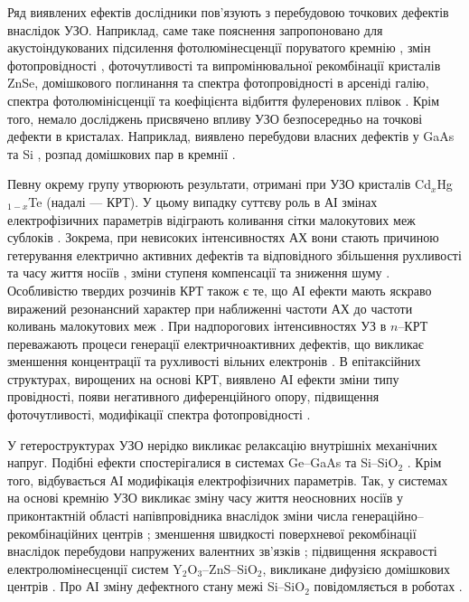 Ряд виявлених ефектів дослідники пов'язують з перебудовою точкових дефектів внаслідок УЗО.
Наприклад, саме таке пояснення запропоновано для акустоіндукованих
підсилення фотолюмінесценції поруватого кремнію \cite{Bahar2003},
змін фотопровідності \cite{US:ZnSe},  фоточутливості та випромінювальної рекомбінації  \cite{ZobovFTP2008} кристалів ZnSe,
домішкового поглинання \cite{Zaver2007} та спектра фотопровідності \cite{UST:GaAs2015} в арсеніді галію,
спектра фотолюмінісценції та коефіцієнта відбиття фулеренових плівок \cite{RITTER2008}.
Крім того, немало досліджень присвячено впливу УЗО безпосередньо на точкові дефекти в кристалах.
Наприклад, виявлено перебудови  власних дефектів у GaAs \cite{Wosinski,Ostapenko1994,buyanova1994} та Si \cite{UST:Onanko},
розпад домішкових пар в кремнії \cite{Ostapenko1995SST,Ostapenko1995,Ostapenko1994APL}.


Певну окрему групу утворюють результати, отримані при УЗО кристалів Cd$_x$Hg$_{1-x}$Te (надалі --- КРТ).
У цьому випадку суттєву роль в АІ змінах електрофізичних параметрів відіграють коливання сітки малокутових меж сублоків \cite{KRT:FTT89,KRT:FTT90}.
Зокрема, при невисоких інтенсивностях АХ вони стають причиною гетерування електрично активних дефектів та відповідного збільшення рухливості та часу життя носіїв \cite{KRT:FTP90,Savkina:SPQEO2006}, зміни ступеня компенсації та зниження шуму \cite{Ol_Shav}.
Особливістю твердих розчинів КРТ також є те, що АІ ефекти мають яскраво виражений резонансний характер при наближенні частоти АХ до частоти коливань малокутових меж \cite{KRT:FTP90,KRT:FTT89,KRT:FTT90,Ol_Shav}.
При надпорогових інтенсивностях УЗ в $n$--КРТ переважають процеси генерації електричноактивних дефектів, що викликає зменшення концентрації та рухливості  вільних електронів \cite{KRT:FTP90,KRT:FTT89}.
В епітаксійних структурах, вирощених на основі КРТ,  виявлено АІ ефекти зміни типу провідності, появи негативного диференційного опору, підвищення фоточутливості, модифікації спектра фотопровідності \cite{Savkina:SST07,SavkinaPSSB2002}.


У гетероструктурах УЗО нерідко викликає релаксацію внутрішніх механічних напруг.
Подібні ефекти спостерігалися в системах Ge--GaAs \cite{BritunFTT,UST:GeGaAs1990} та Si--SiO$_2$ \cite{Zdeb1989}.
Крім того, відбувається АІ модифікація електрофізичних параметрів.
Так, у системах  на основі кремнію УЗО викликає зміну часу життя неосновних носіїв у приконтактній області напівпровідника
внаслідок зміни числа генераційно--рекомбінаційних центрів \cite{Parchinskii2003r,Zdeb1989};
зменшення швидкості поверхневої рекомбінації внаслідок перебудови напружених валентних зв'язків \cite{Vlasov2009r,Parchinskii2003r};
підвищення яскравості електролюмінесценції систем Y$_2$O$_3$--ZnS--SiO$_2$, викликане дифузією домішкових центрів \cite{UST:ZnS}.
Про АІ зміну дефектного стану межі Si--SiO$_2$ повідомляється в роботах \cite{Ostap:SiO2,UST:Medvid}.


